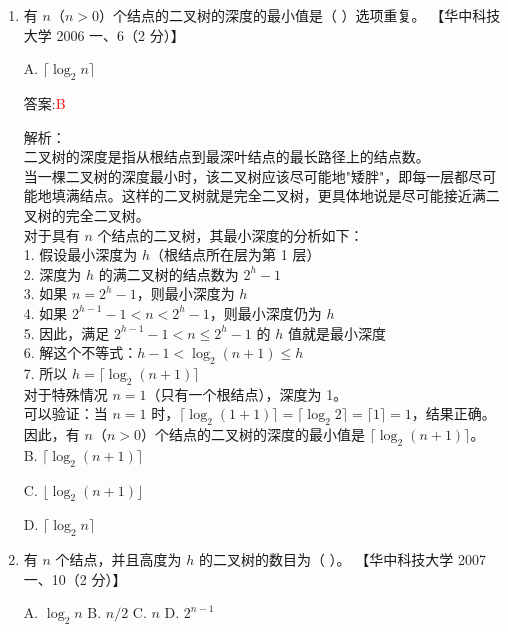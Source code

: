 \documentclass[lang=cn,newtx,10pt,scheme=chinese]{../../../elegantbook}
\begin{document}
\begin{enumerate}
    \item 有 $n$（$n > 0$）个结点的二叉树的深度的最小值是（ ）选项重复。  
    【华中科技大学 2006 一、6（2 分）】  

    A. $\lceil \log_2 n \rceil$  

    答案:\textcolor{red}{B}
    
    解析：\\
    二叉树的深度是指从根结点到最深叶结点的最长路径上的结点数。\\
    
    当一棵二叉树的深度最小时，该二叉树应该尽可能地"矮胖"，即每一层都尽可能地填满结点。这样的二叉树就是完全二叉树，更具体地说是尽可能接近满二叉树的完全二叉树。\\
    
    对于具有 $n$ 个结点的二叉树，其最小深度的分析如下：\\
    1. 假设最小深度为 $h$（根结点所在层为第 1 层）\\
    2. 深度为 $h$ 的满二叉树的结点数为 $2^h - 1$\\
    3. 如果 $n = 2^h - 1$，则最小深度为 $h$\\
    4. 如果 $2^{h-1} - 1 < n < 2^h - 1$，则最小深度仍为 $h$\\
    5. 因此，满足 $2^{h-1} - 1 < n \leq 2^h - 1$ 的 $h$ 值就是最小深度\\
    6. 解这个不等式：$h-1 < \log_2(n+1) \leq h$\\
    7. 所以 $h = \lceil \log_2(n+1) \rceil$\\
    
    对于特殊情况 $n = 1$（只有一个根结点），深度为 1。\\
    
    可以验证：当 $n = 1$ 时，$\lceil \log_2(1+1) \rceil = \lceil \log_2 2 \rceil = \lceil 1 \rceil = 1$，结果正确。\\
    
    因此，有 $n$（$n > 0$）个结点的二叉树的深度的最小值是 $\lceil \log_2(n+1) \rceil$。\\
    
    B. $\lceil \log_2 (n + 1) \rceil$  

    C. $\lfloor \log_2 (n + 1) \rfloor$  

    D. $\lceil \log_2 n \rceil$  

    \item 有 $n$ 个结点，并且高度为 $h$ 的二叉树的数目为（ ）。  
    【华中科技大学 2007 一、10（2 分）】 

    A. $\log_2 n$ \quad B. $n / 2$ \quad C. $n$ \quad D. $2^{n-1}$  


\end{enumerate}
\end{document}
